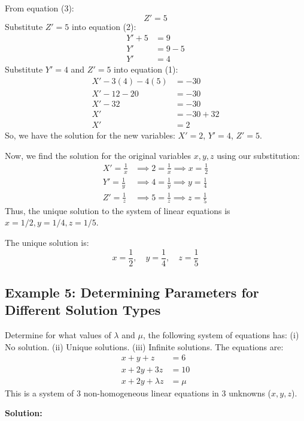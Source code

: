 \documentclass{article}
\begin{document}
From equation (3):
\[ Z' = 5 \]
Substitute $Z'=5$ into equation (2):
\begin{align*} Y' + 5 &= 9 \\ Y' &= 9 - 5 \\ Y' &= 4 \end{align*}
Substitute $Y'=4$ and $Z'=5$ into equation (1):
\begin{align*} X' - 3(4) - 4(5) &= -30 \\ X' - 12 - 20 &= -30 \\ X' - 32 &= -30 \\ X' &= -30 + 32 \\ X' &= 2 \end{align*}
So, we have the solution for the new variables: $X'=2$, $Y'=4$, $Z'=5$.

Now, we find the solution for the original variables $x, y, z$ using our substitution:
\begin{align*} X' = \frac{1}{x} &\implies 2 = \frac{1}{x} \implies x = \frac{1}{2} \\ Y' = \frac{1}{y} &\implies 4 = \frac{1}{y} \implies y = \frac{1}{4} \\ Z' = \frac{1}{z} &\implies 5 = \frac{1}{z} \implies z = \frac{1}{5} \end{align*}
Thus, the unique solution to the system of linear equations is $x=1/2, y=1/4, z=1/5$.

The unique solution is:
\[ x = \frac{1}{2}, \quad y = \frac{1}{4}, \quad z = \frac{1}{5} \]

\subsection{Example 5: Determining Parameters for Different Solution Types} %
Determine for what values of $\lambda$ and $\mu$, the following system of equations has:
(i) No solution.
(ii) Unique solutions.
(iii) Infinite solutions.
The equations are:
\begin{align*} x + y + z &= 6 \\ x + 2y + 3z &= 10 \\ x + 2y + \lambda z &= \mu \end{align*}
This is a system of 3 non-homogeneous linear equations in 3 unknowns ($x, y, z$).

\textbf{Solution:}
\end{document}
